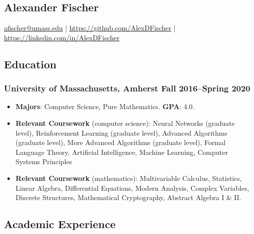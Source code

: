 \documentclass{article}
\begin{document}
	\begin{center}
		\section*{Alexander Fischer}
			\href{mailto:afischer@umass.edu}{afischer@umass.edu} | \href{https://github.com/AlexDFischer}{https://github.com/AlexDFischer} | \href{https://linkedin.com/in/AlexDFischer}{https://linkedin.com/in/AlexDFischer}
    \end{center}
	\subsection*{Education}
		\subsubsection*{University of Massachusetts, Amherst \hfill \normalfont \normalsize Fall 2016--Spring 2020}
			\begin{itemize}[noitemsep,leftmargin=40pt]
				\item \textbf{Majors}: Computer Science, Pure Mathematics. \textbf{GPA}: 4.0.
				\item \textbf{Relevant Coursework} (computer science): Neural Networks (graduate level), Reinforcement Learning (graduate level), Advanced Algorithms (graduate level), More Advanced Algorithms (graduate level), Formal Language Theory, Artificial Intelligence, Machine Learning, Computer Systems Principles
				\item \textbf{Relevant Coursework} (mathematics): Multivariable Calculus, Statistics, Linear Algebra, Differential Equations, Modern Analysis, Complex Variables, Discrete Structures, Mathematical Cryptography, Abstract Algebra I \& II.
			\end{itemize}
			\subsection*{Academic Experience}
\end{document}
